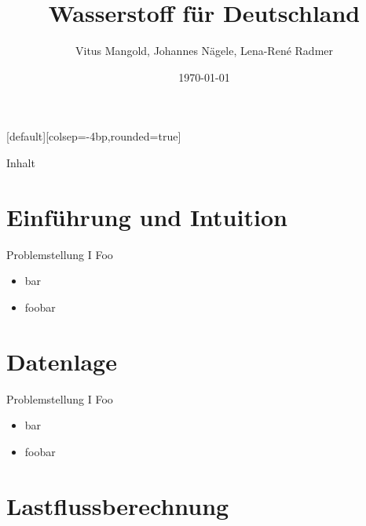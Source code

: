 \documentclass[11pt, ngerman, hyperref={unicode}]{beamer}
\title{Wasserstoff für Deutschland}
\author[Mangold, Nägele, Radmer]{Vitus Mangold, Johannes Nägele, Lena-René Radmer}
\date{\today}
\theoremstyle{definition} %
\begin{document}
	[default][colsep=-4bp,rounded=true]
	\maketitle
	\begin{frame}{Inhalt}
		\tableofcontents
	\end{frame}
	\section{Einführung und Intuition}
	\begin{frame}{Problemstellung I}
		Foo
		\begin{itemize}
			\item bar
			\item foobar
		\end{itemize}
	\end{frame}

	\section{Datenlage}

	\begin{frame}{Problemstellung I}
		Foo
		\begin{itemize}
			\item bar
			\item foobar
		\end{itemize}
	\end{frame}

	\section{Lastflussberechnung}
\end{document}
